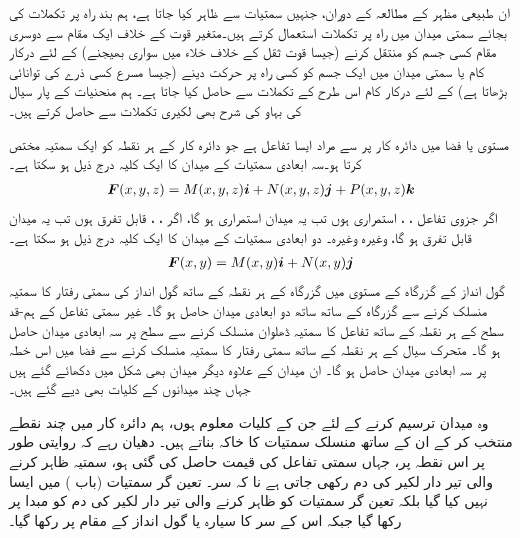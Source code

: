 ان طبیعی  مظہر  کے مطالعہ کے دوران، جنہیں سمتیات سے ظاہر کیا جاتا ہے، ہم بند راہ پر تکملات کی بجائے سمتی میدان میں راہ پر تکملات استعمال کرتے ہیں۔متغیر قوت کے خلاف ایک مقام سے دوسری مقام کسی جسم کو منتقل کرنے (جیسا قوت ثقل کے خلاف خلاء میں سواری بھیجنے) کے لئے درکار کام  یا سمتی میدان میں ایک جسم کو کسی راہ پر حرکت دینے (جیسا مسرع کسی ذرے کی توانائی بڑھاتا ہے)  کے لئے درکار کام   اس طرح کے تکملات سے حاصل کیا جاتا ہے۔  ہم منحنیات کے پار سیال کی بہاو کی شرح بھی لکیری تکملات سے حاصل کرتے ہیں۔

مستوی یا فضا میں دائرہ کار پر   سے مراد ایسا تفاعل ہے جو دائرہ کار کے ہر نقطہ کو ایک سمتیہ مختص کرتا ہو۔سہ ابعادی سمتیات کے میدان کا ایک کلیہ درج ذیل ہو سکتا ہے۔
\begin{align*}
{\ensuremath{{\boldsymbol{F}}}}(x,y,z)=M(x,y,z){\boldsymbol{i}}+N(x,y,z){\boldsymbol{j}}+P(x,y,z){\boldsymbol{k}}
\end{align*}
اگر جزوی تفاعل ، ،  استمراری ہوں تب یہ میدان استمراری ہو گا، اگر ، ،  قابل تفرق ہوں تب یہ میدان قابل تفرق ہو گا، وغیرہ وغیرہ۔ دو ابعادی سمتیات کے میدان کا ایک کلیہ درج ذیل ہو سکتا ہے۔
\begin{align*}
{\ensuremath{{\boldsymbol{F}}}}(x,y)=M(x,y){\boldsymbol{i}}+N(x,y){\boldsymbol{j}}
\end{align*}
گول انداز کے گزرگاہ کے مستوی میں  گزرگاہ کے ہر نقطہ کے ساتھ گول انداز کی سمتی رفتار کا سمتیہ منسلک کرنے سے گزرگاہ  کے ساتھ ساتھ دو ابعادی میدان حاصل ہو گا۔  غیر سمتی تفاعل کے ہم-قد سطح کے ہر نقطہ کے ساتھ  تفاعل کا سمتیہ ڈھلوان منسلک کرنے سے سطح پر سہ ابعادی میدان حاصل ہو گا۔   متحرک سیال کے ہر نقطہ کے ساتھ سمتی رفتار کا سمتیہ منسلک کرنے سے فضا میں اس خطہ پر سہ ابعادی  میدان حاصل ہو گا۔ ان میدان کے علاوہ دیگر میدان بھی شکل میں دکھائے گئے ہیں جہاں چند میدانوں کے کلیات بھی دیے گئے ہیں۔
 

وہ میدان ترسیم کرنے کے لئے جن کے کلیات معلوم ہوں، ہم دائرہ کار میں چند نقطے منتخب کر کے ان کے ساتھ منسلک سمتیات  کا خاکہ بناتے ہیں۔ دھیان رہے کہ روایتی طور پر اس نقطہ پر، جہاں سمتی تفاعل کی قیمت حاصل کی گئی ہو،  سمتیہ ظاہر کرنے والی تیر دار لکیر  کی دم  رکھی جاتی ہے نا کہ سر۔ تعین گر سمتیات (باب ) میں ایسا نہیں کیا گیا بلکہ تعین گر سمتیات کو ظاہر کرنے والی تیر دار لکیر کی دم کو مبدا پر رکھا گیا جبکہ اس کے سر کا سیارہ یا گول انداز کے مقام پر رکھا گیا۔
